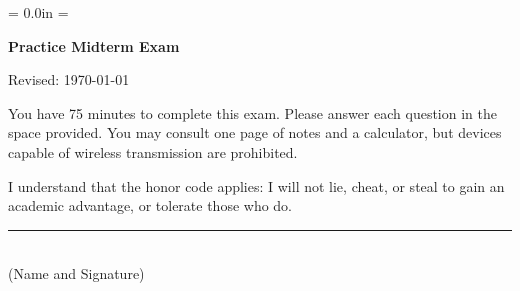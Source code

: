 \documentclass[letterpaper,12pt]{article}
\def\HeadName{Practice Midterm Exam}
\begin{document}
\parindent = 0.0in
\parskip = \bigskipamount
\thispagestyle{empty}%
\Head

\centerline{\large \bf \HeadName}%
\centerline{Revised:  \today}

\bigskip
You have 75 minutes to complete this exam.  Please answer each
question in the space provided. You may consult one page of notes
and a calculator, but devices capable of wireless transmission are
prohibited.

I understand that the honor code applies: I will not lie, cheat, or
steal to gain an academic advantage, or tolerate those who do.

\begin{flushright}
\rule{4in}{0.5pt} \\ (Name and Signature)
\end{flushright}
\end{document}
